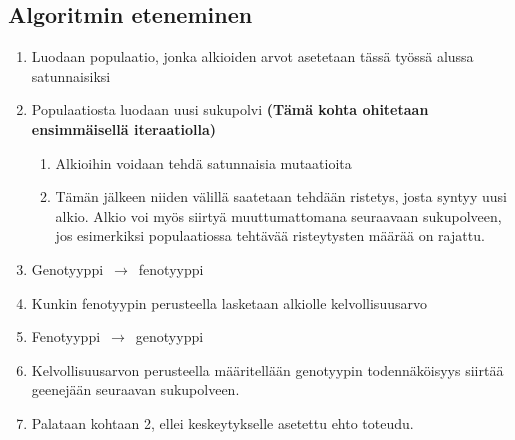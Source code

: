 \subsection{Algoritmin eteneminen}

\begin{enumerate}
	\item Luodaan populaatio, jonka alkioiden arvot asetetaan tässä työssä alussa satunnaisiksi
	\item Populaatiosta luodaan uusi sukupolvi \textbf{(Tämä kohta ohitetaan ensimmäisellä iteraatiolla)}
	\begin{enumerate}
		\item Alkioihin voidaan tehdä satunnaisia mutaatioita
		\item Tämän jälkeen niiden välillä saatetaan tehdään ristetys, josta syntyy uusi alkio.
		Alkio voi myös siirtyä muuttumattomana seuraavaan sukupolveen, jos esimerkiksi
		populaatiossa tehtävää risteytysten määrää on rajattu.
	\end{enumerate}
	\item Genotyyppi~\(\rightarrow\)~fenotyyppi
	\item	Kunkin fenotyypin perusteella lasketaan alkiolle kelvollisuusarvo
	\item Fenotyyppi~\(\rightarrow\)~genotyyppi
	\item Kelvollisuusarvon perusteella määritellään genotyypin todennäköisyys
	siirtää geenejään seuraavan sukupolveen.
	\item Palataan kohtaan 2, ellei keskeytykselle asetettu ehto toteudu.
\end{enumerate}
